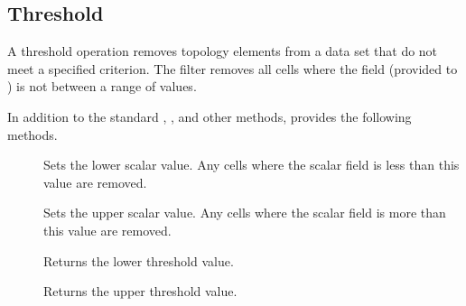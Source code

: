 
\subsection{Threshold}


A threshold operation removes topology elements from a data set that do not
meet a specified criterion. The  filter removes all
cells where the field (provided to ) is not between a
range of values.

In addition to the standard ,
, and other methods,
 provides the following methods.

\begin{description}
\item[] Sets the lower scalar value. Any cells
  where the scalar field is less than this value are removed.
\item[] Sets the upper scalar value. Any cells
  where the scalar field is more than this value are removed.
\item[] Returns the lower threshold value.
\item[] Returns the upper threshold value.
\end{description}




